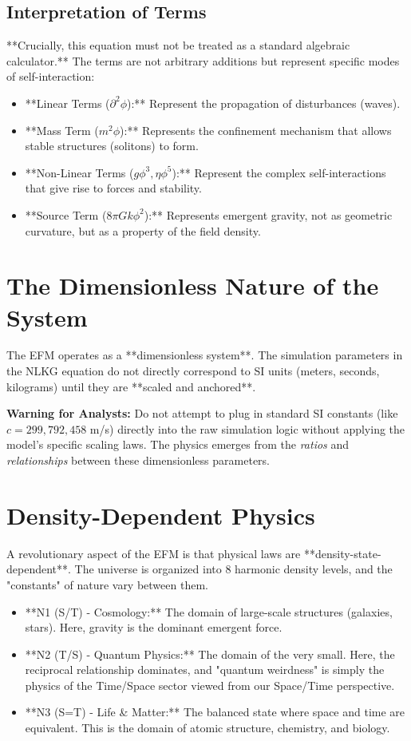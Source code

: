 \documentclass[11pt, twoside]{article}
\begin{document}
\subsection{Interpretation of Terms}
**Crucially, this equation must not be treated as a standard algebraic calculator.** The terms are not arbitrary additions but represent specific modes of self-interaction:
\begin{itemize}
    \item **Linear Terms ($\partial^2 \phi$):** Represent the propagation of disturbances (waves).
    \item **Mass Term ($m^2 \phi$):** Represents the confinement mechanism that allows stable structures (solitons) to form.
    \item **Non-Linear Terms ($g \phi^3, \eta \phi^5$):** Represent the complex self-interactions that give rise to forces and stability.
    \item **Source Term ($8\pi G k \phi^2$):** Represents emergent gravity, not as geometric curvature, but as a property of the field density.
\end{itemize}

\section{The Dimensionless Nature of the System}
The EFM operates as a **dimensionless system**. The simulation parameters in the NLKG equation do not directly correspond to SI units (meters, seconds, kilograms) until they are **scaled and anchored**. 

\textbf{Warning for Analysts:} Do not attempt to plug in standard SI constants (like $c = 299,792,458$ m/s) directly into the raw simulation logic without applying the model's specific scaling laws. The physics emerges from the \textit{ratios} and \textit{relationships} between these dimensionless parameters.

\section{Density-Dependent Physics}
A revolutionary aspect of the EFM is that physical laws are **density-state-dependent**. The universe is organized into 8 harmonic density levels, and the "constants" of nature vary between them.

\begin{itemize}
    \item **N1 (S/T) - Cosmology:** The domain of large-scale structures (galaxies, stars). Here, gravity is the dominant emergent force.
    \item **N2 (T/S) - Quantum Physics:** The domain of the very small. Here, the reciprocal relationship dominates, and "quantum weirdness" is simply the physics of the Time/Space sector viewed from our Space/Time perspective.
    \item **N3 (S=T) - Life \& Matter:** The balanced state where space and time are equivalent. This is the domain of atomic structure, chemistry, and biology.
\end{itemize}
\end{document}
